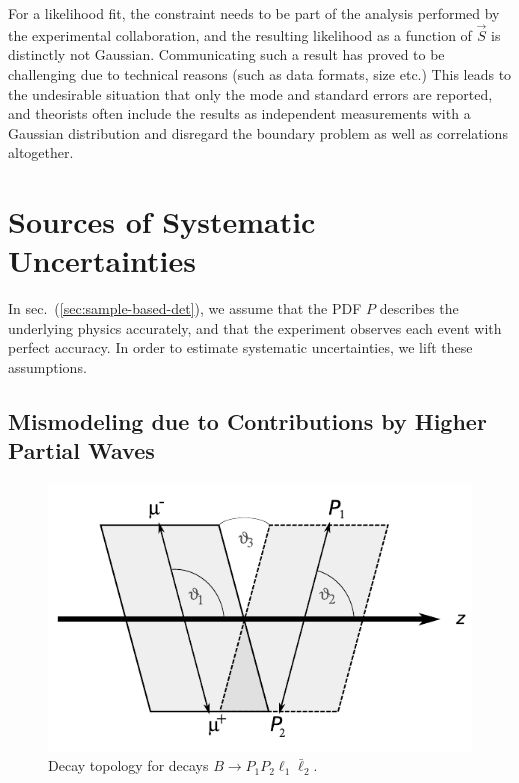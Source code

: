 \documentclass[aps,nofootinbib,preprintnumbers,prd,twocolumn]{revtex4-1}
\newcommand{\refsec}[1]{sec.~(\ref{sec:#1})}
\newcommand{\add}[1]{\textcolor{green!85!black}{#1}}
\begin{document}
\begin{enumerate}
  For a likelihood fit, the constraint needs to be part of the
  analysis performed by the experimental collaboration, and the
  resulting likelihood as a function of $\vec{S}$ is distinctly not
  Gaussian.  Communicating such a result has
  proved to be challenging due to technical reasons (such as data formats,
  size etc.) %
  This leads to the
  undesirable situation that only the mode and standard errors
  are reported, and theorists often include the results as independent
  measurements with a Gaussian distribution and disregard the boundary
  problem as well as correlations altogether.

\end{enumerate}



\section{Sources of Systematic Uncertainties}
\label{sec:systematics}

In \refsec{sample-based-det}, we assume that the PDF $P$ describes the underlying physics accurately,
and that the experiment observes each event with perfect accuracy. In order to estimate systematic
uncertainties, we lift these assumptions.

\subsection{Mismodeling due to Contributions by Higher Partial Waves}
\label{sec:systematics:partial-waves}

\begin{figure}
    \includegraphics[width=.45\textwidth]{fig-topology.pdf}
    \caption{Decay topology for decays $B\to P_1 P_2 \ell_1 \bar\ell_2$. \label{fig:topology}}
\end{figure}
\end{document}
